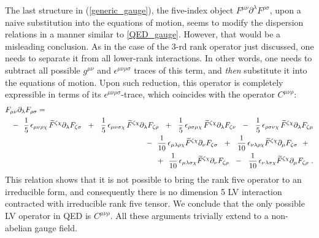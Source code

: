 \documentclass[12pt,preprintnumbers,nofootinbib]{revtex4}
\newcommand{\p}{\partial}
\newcommand{\wt}{\widetilde}
\begin{document}
	The last structure in (\ref{generic_gauge}), the five-index object
$ F^{\mu\nu} \partial^\lambda F^{\rho\sigma} $,
	upon a naive substitution
	into the equations of motion, 
	seems to modify the dispersion relations in a manner similar to \eqref{QED_gauge}.
	However, that would be a misleading conclusion.
	As in the case of the 3-rd rank operator just discussed,
one needs to separate it from all 
	lower-rank interactions.
	In other words, one needs to subtract all possible 
	$ g^{\mu\nu} $ and $ \epsilon^{\mu\nu\rho\sigma} $ 
	traces of this term, and {\it then} substitute it into the
	equations of motion.
	Upon such reduction, this operator is completely expressible
	in terms of its $ \epsilon^{\mu\nu\rho\sigma} $-trace, which
	coincides with the operator $ C^{\mu\nu\rho} $:
\begin{eqnarray*}
\lefteqn{
	F_{\mu\nu} \p_\lambda F_{\rho\sigma} = 
	} &&
	\\
	&&
	-~~ 
	\frac{1}{5}\,\epsilon_{\mu\nu\rho\chi} \,
	\wt{F}^{\zeta\chi}\p_\lambda F_{\zeta\sigma} 
 	~~+~~
	\frac{1}{5}\,\epsilon_{\mu\nu\sigma\chi} \,
	\wt{F}^{\zeta\chi}\p_\lambda F_{\zeta\rho} 
	~~+~~
	\frac{1}{5}\,\epsilon_{\rho\sigma\mu\chi} \,
	\wt{F}^{\zeta\chi}\p_\lambda F_{\zeta\nu} 
 	~~-~~
	\frac{1}{5}\,\epsilon_{\rho\sigma\nu\chi} \,
	\wt{F}^{\zeta\chi}\p_\lambda F_{\zeta\mu}
	\\
	&&
	-~~
	\frac{1}{10}\,\epsilon_{\mu\lambda\rho\chi} 
	\wt{F}^{\zeta\chi}\p_\nu F_{\zeta\sigma} 
	~~+~~
	\frac{1}{10}\,\epsilon_{\nu\lambda\rho\chi} 
	\wt{F}^{\zeta\chi}\p_\mu F_{\zeta\sigma} 
	~~+~~
	\\
	&&
	+~~
	\frac{1}{10}\,\epsilon_{\mu\lambda\sigma\chi} 
	\wt{F}^{\zeta\chi}\p_\nu F_{\zeta\rho} 
	~~-~~
	\frac{1}{10}\,\epsilon_{\nu\lambda\sigma\chi} 
	\wt{F}^{\zeta\chi}\p_\mu F_{\zeta\rho}
	~.
\end{eqnarray*}
	This relation shows that it is not possible to bring the rank five operator
	to an irreducible form,  and consequently there is no dimension 5 LV interaction 
    contracted with irreducible rank five tensor. 
We conclude that the only possible
	LV operator in QED is $ C^{\mu\nu\rho} $.  
	All these arguments trivially extend to a non-abelian gauge
	field.
\end{document}
